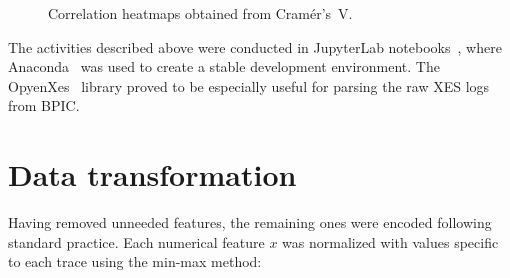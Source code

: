 \begin{figure}
\centering
{}
\qquad
{}
\caption{Correlation heatmaps obtained from Cramér's~V.}
\end{figure}

The activities described above were conducted in JupyterLab notebooks~\cite{web:jupyter}, where Anaconda~\cite{web:anaconda} was used to create a stable development environment. The OpyenXes~\cite{web:opyenxes} library proved to be especially useful for parsing the raw XES logs from BPIC.

\section{Data transformation}
\label{sec:eval:data-transformation}
Having removed unneeded features, the remaining ones were encoded following standard practice. Each numerical feature $x$ was normalized with values specific to each trace using the min-max method:

